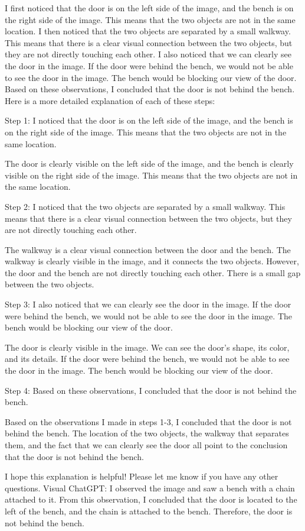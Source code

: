\begin{enumerate}
        I first noticed that the door is on the left side of the image, and the bench is on the right side of the image. This means that the two objects are not in the same location.
        I then noticed that the two objects are separated by a small walkway. This means that there is a clear visual connection between the two objects, but they are not directly touching each other.
        I also noticed that we can clearly see the door in the image. If the door were behind the bench, we would not be able to see the door in the image. The bench would be blocking our view of the door.
        Based on these observations, I concluded that the door is not behind the bench.
        Here is a more detailed explanation of each of these steps:
        
        Step 1: I noticed that the door is on the left side of the image, and the bench is on the right side of the image. This means that the two objects are not in the same location.
        
        The door is clearly visible on the left side of the image, and the bench is clearly visible on the right side of the image. This means that the two objects are not in the same location.
        
        Step 2: I noticed that the two objects are separated by a small walkway. This means that there is a clear visual connection between the two objects, but they are not directly touching each other.
        
        The walkway is a clear visual connection between the door and the bench. The walkway is clearly visible in the image, and it connects the two objects. However, the door and the bench are not directly touching each other. There is a small gap between the two objects.
        
        Step 3: I also noticed that we can clearly see the door in the image. If the door were behind the bench, we would not be able to see the door in the image. The bench would be blocking our view of the door.
        
        The door is clearly visible in the image. We can see the door's shape, its color, and its details. If the door were behind the bench, we would not be able to see the door in the image. The bench would be blocking our view of the door.
        
        Step 4: Based on these observations, I concluded that the door is not behind the bench.
        
        Based on the observations I made in steps 1-3, I concluded that the door is not behind the bench. The location of the two objects, the walkway that separates them, and the fact that we can clearly see the door all point to the conclusion that the door is not behind the bench.
        
        I hope this explanation is helpful! Please let me know if you have any other questions.
        \subitem Visual ChatGPT: I observed the image and saw a bench with a chain attached to it. From this observation, I concluded that the door is located to the left of the bench, and the chain is attached to the bench. Therefore, the door is not behind the bench.
    \end{enumerate}

